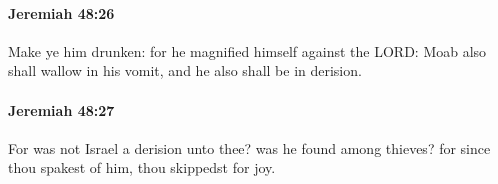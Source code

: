 		\paragraph{Jeremiah 48:26} %
			\label{JEREMIAH-48-26}

			Make ye him drunken: for he magnified himself against the LORD: Moab also shall wallow in his vomit, and he also shall be in derision.


		\paragraph{Jeremiah 48:27} %
			\label{JEREMIAH-48-27}

			For was not Israel a derision unto thee? was he found among thieves? for since thou spakest of him, thou skippedst for joy.


